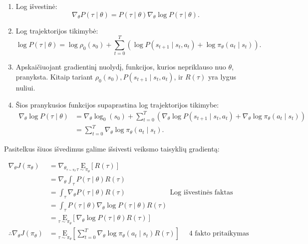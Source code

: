 \documentclass[a4paper, 12pt]{article}
\begin{document}
\begin{enumerate}
  \addtolength{\itemsep}{-0.5\baselineskip} 
  \item Log išvestinė:
\begin{equation}
\nabla_{\theta} P(\tau \mid \theta)=P(\tau \mid \theta) \nabla_{\theta} \log P(\tau \mid \theta).
\end{equation}
  \item Log trajektorijos tikimybė:
\begin{equation}
\log P(\tau \mid \theta)=\log \rho_{0}\left(s_{0}\right)+\sum_{t=0}^{T}\left(\log P\left(s_{t+1} \mid s_{t}, a_{t}\right)+\log \pi_{\theta}\left(a_{t} \mid s_{t}\right)\right).
\end{equation}
  \item Apskaičiuojant gradientinį nuolydį, funkcijos, kurios nepriklauso nuo $\theta$, pranyksta. Kitaip tariant $\rho_{0}\left(s_{0}\right), P\left(s_{t+1} \mid s_{t}, a_{t}\right)$, ir $R(\tau)$ yra lygus nuliui.
 \item Šios pranykusios funkcijos supaprastina log trajektorijos tikimybe:
\begin{equation}
\begin{aligned}
\nabla_{\theta} \log P(\tau \mid \theta) &=\nabla_{\theta} \log _{0}\left(s_{0}\right)+\sum_{t=0}^{T}\left(\nabla_{\theta} \log P\left(s_{t+1} \mid s_{t}, a_{t}\right)+\nabla_{\theta} \log \pi_{\theta}\left(a_{t} \mid s_{t}\right)\right) \\
&=\sum_{t=0}^{T} \nabla_{\theta} \log \pi_{\theta}\left(a_{t} \mid s_{t}\right).
\end{aligned}
\end{equation}
\end{enumerate}

Pasitelkus šiuos išvedimus galime išsivesti veiksmo taisyklių gradientą:

\begin{equation}
\begin{array}{rlr}
\label{megaVeiksmuGradientas}
\nabla_{\theta} J\left(\pi_{\theta}\right) & =\nabla_{\theta_{\tau \sim \pi_{\theta}}} \underset{\tau \sim \pi_{\theta}}{\mathrm{E}}[R(\tau)]  \\
& =\nabla_{\theta} \int_{\tau} P(\tau \mid \theta) R(\tau)  \\
& =\int_{\tau} \nabla_{\theta} P(\tau \mid \theta) R(\tau)  \quad \quad \quad \quad \quad \quad \text { Log išvestinės faktas } \\
& =\int_{\tau} P(\tau \mid \theta) \nabla_{\theta} \log P(\tau \mid \theta) R(\tau)  \\
& =\underset{\tau \sim \pi_{\theta}}{\mathrm{E}}\left[\nabla_{\theta} \log P(\tau \mid \theta) R(\tau)\right]  \\
\therefore \nabla_{\theta} J\left(\pi_{\theta}\right) & =\underset{\tau \sim \pi_{\theta}}{\mathrm{E}}\left[\sum_{t=0}^{T} \nabla_{\theta} \log \pi_{\theta}\left(a_{t} \mid s_{t}\right) R(\tau)\right] \quad \text { 4 fakto pritaikymas }
\end{array}
\end{equation}
\end{document}
